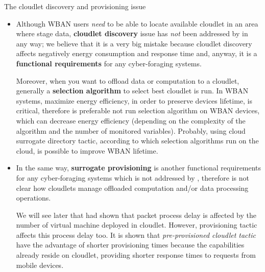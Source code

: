 \documentclass[10pt]{beamer}
\begin{document}
\begin{frame}{The cloudlet discovery and provisioning issue} 

\begin{itemize}

\item Although WBAN users \textit{need} to be able to locate available cloudlet in an area where stage data, \textbf{cloudlet discovery} issue has \textit{not} been addressed by \citet{MSAReport} in any way; we believe that it is a very big mistake because cloudlet discovery affects negatively energy consumption and response time and, anyway, it is a \textbf{functional requirements} for any cyber-foraging systems. 

Moreover, when you want to offload data or computation to a cloudlet, generally a \textbf{selection algorithm} to select best cloudlet is run. In WBAN systems, maximize energy efficiency, in order to preserve devices lifetime, is critical, therefore is preferable not run selection algorithm on WBAN devices, which can decrease energy efficiency (depending on the complexity of the algorithm and the number of monitored variables). Probably, using cloud surrogate directory tactic, according to which selection algorithms run on the cloud, is possible to improve WBAN lifetime. \cite{DecisionModel}

\item In the same way, \textbf{surrogate provisioning} is another functional requirements for any cyber-foraging systems which is not addressed by \citet{MSAReport}, therefore is not clear how cloudlets manage offloaded computation and/or data processing operations.

We will see later that \citet{MSAReport} had shown that packet process delay is affected by the number of virtual machine deployed in cloudlet. However, provisioning tactic affects this process delay too. It is shown that \textit{pre-provisioned cloudlet tactic} have the advantage of shorter provisioning times because the capabilities already reside on cloudlet, providing shorter response times to requests from mobile devices.\cite{DecisionModel}

\end{itemize}


\end{frame} 
\end{document}
